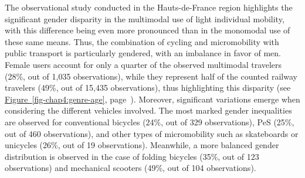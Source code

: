\begin{refsegment}
The observational study conducted in the Hauts-de-France region highlights the significant gender disparity in the multimodal use of light individual mobility, with this difference being even more pronounced than in the monomodal use of these same means. Thus, the combination of cycling and micromobility with public transport is particularly gendered, with an imbalance in favor of men. Female users account for only a quarter of the observed multimodal travelers (28\%, out of 1,035 observations), while they represent half of the counted railway travelers (49\%, out of 15,435 observations), thus highlighting this disparity (see \hyperref[fig-chap4:genre-age]{Figure~\ref{fig-chap4:genre-age}}, page~\pageref{fig-chap4:genre-age}). Moreover, significant variations emerge when considering the different vehicles involved. The most marked gender inequalities are observed for conventional bicycles (24\%, out of 329 observations), \acrshort{PeS} (25\%, out of 460 observations), and other types of micromobility such as skateboards or unicycles (26\%, out of 19 observations). Meanwhile, a more balanced gender distribution is observed in the case of folding bicycles (35\%, out of 123 observations) and mechanical scooters (49\%, out of 104 observations). %


\end{refsegment}
